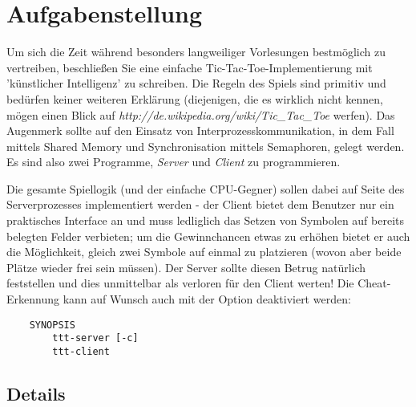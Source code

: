 




\section*{Aufgabenstellung}

Um sich die Zeit während besonders langweiliger Vorlesungen bestmöglich
zu vertreiben, beschließen Sie eine einfache Tic-Tac-Toe-Implementierung
mit 'künstlicher Intelligenz' zu schreiben. Die Regeln des Spiels sind
primitiv und bedürfen keiner weiteren Erklärung (diejenigen, die es wirklich nicht
kennen, mögen einen Blick auf \textit{http://de.wikipedia.org/wiki/Tic\_Tac\_Toe}
werfen). Das Augenmerk sollte auf den Einsatz von Interprozesskommunikation, in dem Fall 
mittels Shared Memory und Synchronisation mittels Semaphoren, gelegt werden. \\
Es sind also zwei Programme, \textit{Server} und \textit{Client} zu programmieren.

Die gesamte Spiellogik (und der einfache CPU-Gegner) sollen dabei auf Seite des 
Serverprozesses implementiert werden - der Client bietet dem Benutzer nur
ein praktisches Interface an und muss ledliglich das Setzen von Symbolen auf
bereits belegten Felder verbieten; um die Gewinnchancen etwas zu erhöhen bietet
er auch die Möglichkeit, gleich zwei Symbole auf einmal zu platzieren (wovon
aber beide Plätze wieder frei sein müssen). Der Server sollte diesen Betrug
natürlich feststellen und dies unmittelbar als verloren für den Client werten!
Die Cheat-Erkennung kann auf Wunsch auch mit der Option  deaktiviert
werden:

\begin{verbatim}
    SYNOPSIS
        ttt-server [-c]
        ttt-client 
\end{verbatim}

\subsection*{Details}
